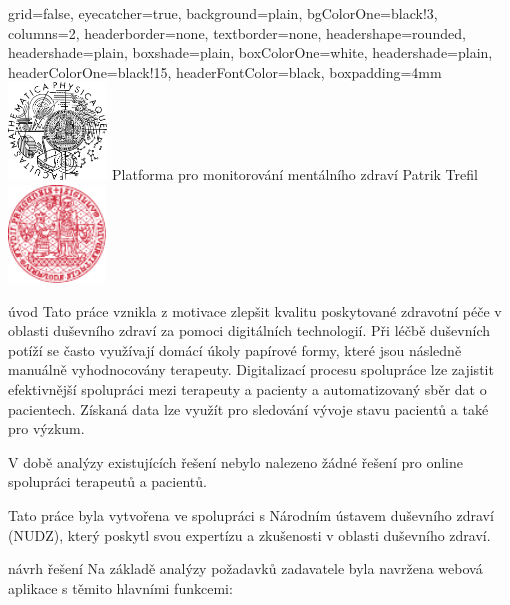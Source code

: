 \documentclass[portrait,a0paper,fontscale=0.25]{baposter}
\begin{document}
    \color{black!80} %
    \begin{poster}{grid=false,
        eyecatcher=true,
        background=plain,
        bgColorOne=black!3, %
        columns=2,
        headerborder=none,
        textborder=none,
        headershape=rounded,
        headershade=plain,
        boxshade=plain,
        boxColorOne=white,
        headershade=plain,
        headerColorOne=black!15, %
        headerFontColor=black,
        boxpadding=4mm
    }%
    {\includegraphics[height=7em]{logos/mff-black}}
    {Platforma pro monitorování mentálního zdraví}
    {\vspace{1ex} Patrik Trefil}
    {\includegraphics[height=7em]{logos/uk-red}}


%
%

        \begin{posterbox}[column=0,name=intro]{úvod}
            Tato práce vznikla z motivace zlepšit kvalitu poskytované zdravotní péče v oblasti duševního zdraví za pomoci digitálních technologií.
            Při léčbě duševních potíží se často využívají domácí úkoly papírové formy, které jsou následně manuálně vyhodnocovány terapeuty.
            Digitalizací procesu spolupráce lze zajistit efektivnější spolupráci mezi terapeuty a pacienty a automatizovaný sběr dat o pacientech.
            Získaná data lze využít pro sledování vývoje stavu pacientů a také pro výzkum.

            V době analýzy existujících řešení nebylo nalezeno žádné řešení pro online spolupráci terapeutů a pacientů.

            Tato práce byla vytvořena ve spolupráci s Národním ústavem duševního zdraví (NUDZ), který poskytl svou expertízu a zkušenosti v oblasti duševního zdraví.
        \end{posterbox}

        \begin{posterbox}[column=0, name=goals, below=intro]{návrh řešení}
            Na základě analýzy požadavků zadavatele byla navržena webová aplikace s těmito hlavními funkcemi:


\end{posterbox}
\end{poster}
\end{document}

